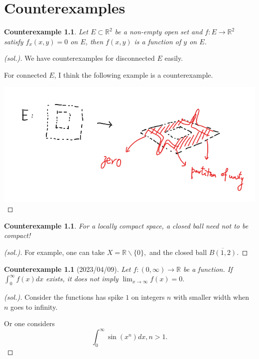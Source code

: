 \documentclass{book}
\newtheorem{counter}[defi]{Counterexample}
\numberwithin{equation}{section}
\begin{document}
\chapter{Counterexamples}
\begin{counter}
Let $E\subset \mathbb{R}^2$ be a non-empty open set and $f: E \rightarrow\mathbb{R}^2$
satisfy $f_x(x, y)=0$ on $E$, then $f(x, y)$ is a function of $y$ on $E$.
\end{counter}
\begin{proof}[(sol.)]
We have counterexamples for disconnected $E$ easily.\medskip

For connected $E$, I think the following example is a counterexample.\medskip

\includegraphics[scale=0.6]{partition of unity.PNG} \medskip
\end{proof}

\begin{counter}
For a locally compact space, a closed ball need not to be compact!
\end{counter}
\begin{proof}[(sol.)]
For example, one can take $X=\mathbb{R}\backslash \{0\},$ and the closed ball $\overline{B(1,2)}.$
\end{proof}

\begin{counter}[2023/04/09]
    Let $f: (0,\infty) \rightarrow \mathbb{R}$ be a function. If $\int_0^\infty f(x) dx$ exists, it does not imply $\lim_{x\rightarrow \infty}f(x) =0.$ 
\end{counter}
\begin{proof}[(sol.)]
Consider the functions has spike $1$ on integers $n$ with smaller width when $n$ goes to infinity. \medskip

Or one considers
$$
\int_0^\infty \sin(x^n) dx, n>1.
$$
\end{proof}
\end{document}
